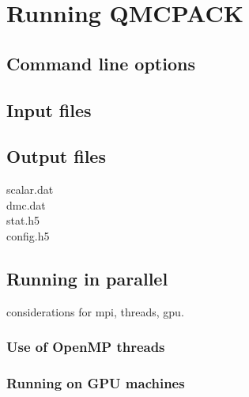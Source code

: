 \chapter{Running QMCPACK}
\label{chap:running}

\section{Command line options}
\label{sec:commandline}


\section{Input files}
\label{sec:inputs}

\section{Output files}
\label{sec:outputs}

  scalar.dat\\
  dmc.dat\\
  stat.h5\\
  config.h5

\section{Running in parallel}
\label{sec:parallelrunning}

considerations for mpi, threads, gpu.

\subsection{Use of OpenMP threads}
\label{sec:openmprunning}

\subsection{Running on GPU machines}
\label{sec:gpurunning}
